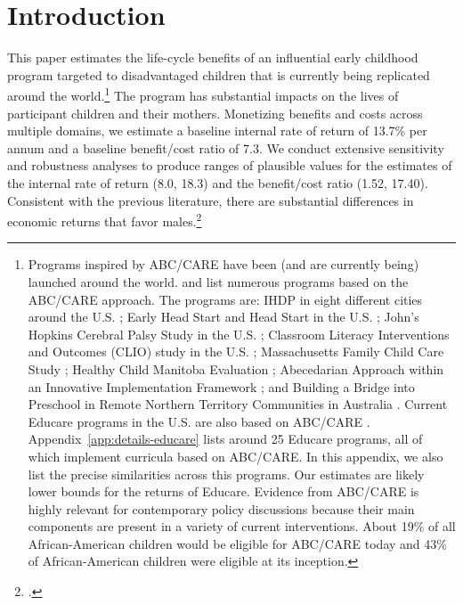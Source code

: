 \section{Introduction}

This paper estimates the life-cycle benefits of an influential early childhood program targeted to disadvantaged children that is currently being replicated around the world.\footnote{Programs inspired by ABC/CARE have been (and are currently being) launched around the world. \citet{Sparling_2010_Highlights} and \citet{Ramey_Ramey_Lanzi_2014_Interventions} list numerous programs based on the ABC/CARE approach. The programs are: IHDP in eight different cities around the U.S. \citep{Spiker-etal_1997_Helping}; Early Head Start and Head Start in the U.S. \citep{Schneider_McDonald-eds_2007_Scale-Up_Vol-1}; John's Hopkins Cerebral Palsy Study in the U.S. \citep{Sparling_2010_Highlights}; Classroom Literacy Interventions and Outcomes (CLIO) study in the U.S. \citep{Sparling_2010_Highlights}; Massachusetts Family Child Care Study \citep{Collins_etal_2010_Massachusetts-Study}; Healthy Child Manitoba Evaluation \citep{Healthy_Child_Manitoba_2015_Starting-Early}; Abecedarian Approach within an Innovative Implementation Framework \citep{Jensen_Nielsen_2016_ABC-Programme-Pilot}; and Building a Bridge into Preschool in Remote Northern Territory Communities in Australia \citep{UMonash_Dataset_2015_URL}. Current Educare programs in the U.S. are also based on ABC/CARE \citep{Educare_2014_Research_Agenda,Yazejian_Bryant_2012_Educare}. Appendix~\ref{app:details-educare} lists around 25 Educare programs, all of which implement curricula based on ABC/CARE. In this appendix, we also list the precise similarities across this programs. Our estimates are likely lower bounds for the returns of Educare. Evidence from ABC/CARE is highly relevant for contemporary policy discussions because their main components are present in a variety of current interventions. About 19\% of all African-American children would be eligible for ABC/CARE today and 43\% of African-American children were eligible at its inception.} The program has substantial impacts on the lives of  participant children and their mothers. Monetizing benefits and costs across multiple domains, we estimate a baseline internal rate of return of 13.7\% per annum and a baseline benefit/cost ratio of 7.3. We conduct extensive sensitivity and robustness analyses to produce ranges of plausible values for the estimates of the internal rate of return (8.0, 18.3) and the benefit/cost ratio (1.52, 17.40). Consistent with the previous literature, there are substantial differences in economic returns that favor males.\footnote{\cite{Garcia_Heckman_Ziff_2017_Gender-Diff_UNPUBLISHED}.}

